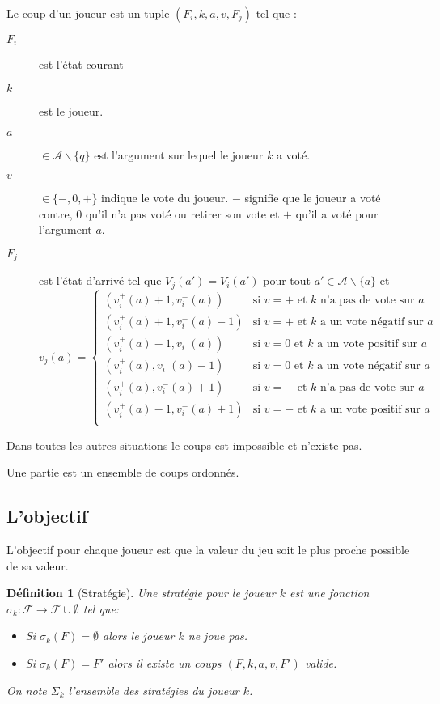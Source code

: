 \documentclass[11pt]{article}
\theoremstyle{defi}
\newtheorem{definition}{Définition}[section]
\theoremstyle{not}
\theoremstyle{prob}
\begin{document}
      Le coup d'un joueur est un tuple $(F_i, k, a, v, F_j)$ tel que :
      \begin{description}
        \item[$F_i$] est l'état courant
        \item[$k$] est le joueur.
        \item[$a$] $\in \mathcal{A}\backslash \{q\}$ est l'argument sur lequel le joueur $k$ a voté.
        \item[$v$] $\in \{-, 0, +\}$ indique le vote du joueur. $-$ signifie que le joueur a voté contre, $0$ qu'il n'a pas voté ou retirer son vote et $+$ qu'il a voté pour l'argument $a$.
        \item[$F_j$] est l'état d'arrivé tel que $V_j(a') = V_i(a')$ pour tout $a' \in \mathcal{A}\backslash\{a\}$ et
        $$
        v_j(a) = \left\{
          \begin{array}{ll}
            (v_i^+(a) + 1, v_i^-(a)) & \mbox{si } v = + \mbox{ et } k \mbox{ n'a pas de vote sur } a \\
            (v_i^+(a) + 1, v_i^-(a) - 1) & \mbox{si } v = + \mbox{ et } k \mbox{ a un vote négatif sur } a \\
            (v_i^+(a) - 1, v_i^-(a)) & \mbox{si } v = 0 \mbox{ et } k \mbox{ a un vote positif sur } a \\
            (v_i^+(a), v_i^-(a) - 1) & \mbox{si } v = 0 \mbox{ et } k \mbox{ a un vote négatif sur } a \\
            (v_i^+(a), v_i^-(a) + 1) & \mbox{si } v = - \mbox{ et } k \mbox{ n'a pas de vote sur } a \\
            (v_i^+(a) - 1, v_i^-(a) + 1) & \mbox{si } v = - \mbox{ et } k \mbox{ a un vote positif sur } a \\
          \end{array}
        \right.
        $$
      \end{description}

      Dans toutes les autres situations le coups est impossible et n'existe pas.

      Une partie est un ensemble de coups ordonnés.

    \subsection{L'objectif}
      L'objectif pour chaque joueur est que la valeur du jeu soit le plus proche possible de sa valeur.

      \begin{definition}[Stratégie]
        Une stratégie pour le joueur $k$ est une fonction $\sigma_k : \mathcal{F} \longrightarrow \mathcal{F}\cup \emptyset$ tel que:
        \begin{itemize}
          \item Si $\sigma_k(F) = \emptyset$ alors le joueur $k$ ne joue pas.
          \item Si $\sigma_k(F) = F'$ alors il existe un coups $(F, k, a, v, F')$ valide.
        \end{itemize}

        On note $\Sigma_k$ l'ensemble des stratégies du joueur $k$.
      \end{definition}
\end{document}
